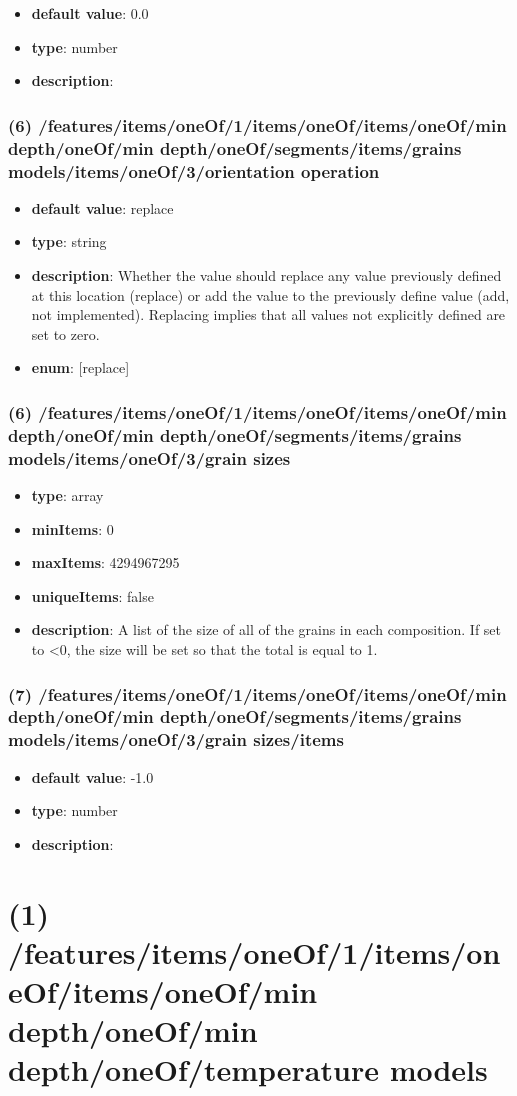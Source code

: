 \begin{itemize}[leftmargin=8em]\item {\bf default value}: 0.0
\item {\bf type}: number
\item {\bf description}: 
\end{itemize}\subsubsection{(6) /features/items/oneOf/1/items/oneOf/items/oneOf/min depth/oneOf/min depth/oneOf/segments/items/grains models/items/oneOf/3/orientation operation}
\begin{itemize}[leftmargin=6em]\item {\bf default value}: replace
\item {\bf type}: string
\item {\bf description}: Whether the value should replace any value previously defined at this location (replace) or add the value to the previously define value (add, not implemented). Replacing implies that all values not explicitly defined are set to zero.
\item {\bf enum}: [replace]\end{itemize}\subsubsection{(6) /features/items/oneOf/1/items/oneOf/items/oneOf/min depth/oneOf/min depth/oneOf/segments/items/grains models/items/oneOf/3/grain sizes}
\begin{itemize}[leftmargin=6em]\item {\bf type}: array
\item {\bf minItems}: 0
\item {\bf maxItems}: 4294967295
\item {\bf uniqueItems}: false
\item {\bf description}: A list of the size of all of the grains in each composition. If set to <0, the size will be set so that the total is equal to 1.
\end{itemize}\subsubsection{(7) /features/items/oneOf/1/items/oneOf/items/oneOf/min depth/oneOf/min depth/oneOf/segments/items/grains models/items/oneOf/3/grain sizes/items}
\begin{itemize}[leftmargin=7em]\item {\bf default value}: -1.0
\item {\bf type}: number
\item {\bf description}: 
\end{itemize}\section{(1) /features/items/oneOf/1/items/oneOf/items/oneOf/min depth/oneOf/min depth/oneOf/temperature models}
